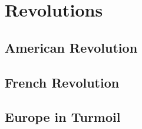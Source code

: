 \chapter{Revolutions}

\section{American Revolution}

\section{French Revolution}

\section{Europe in Turmoil}

